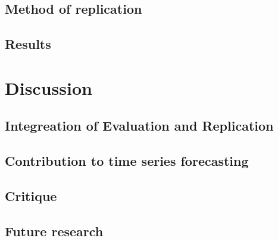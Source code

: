 \documentclass[letterpaper,twocolumn,11pt]{article}
\begin{document}
    \subsection{Method of replication}

    \subsection{Results}


    \section{Discussion}

    \subsection{Integreation of Evaluation and Replication}

    \subsection{Contribution to time series forecasting}

    \subsection{Critique}
    \subsection{Future research}

    {\footnotesize 
    }


    \theendnotes
\end{document}

